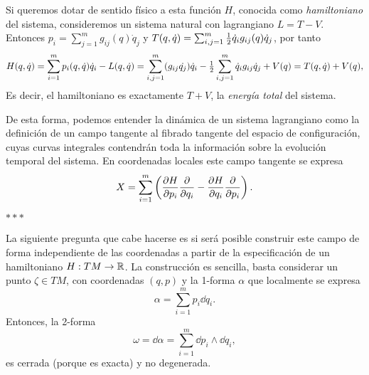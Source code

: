   Si queremos dotar de sentido físico a esta función $H$, conocida como \emph{hamiltoniano} del sistema, consideremos un sistema natural con lagrangiano $L=T-V$. Entonces $p_i=\sum_{j=1}^m g_{ij}(q)\dot{q}_j$ y $T(q,\dot{q})=\sum_{i,j=1}^m\tfrac{1}{2}\dot{q}_ig_{ij}(q)\dot{q}_j$, por tanto
\begin{equation*}
  H(q,\dot{q})=\sum_{i=1}^m p_i(q,\dot{q})\dot{q}_i - L(q,\dot{q})=\sum_{i,j=1}^m (g_{ij} \dot{q_j})\dot{q}_i - \tfrac{1}{2}\sum_{i,j=1}^m \dot{q}_i g_{ij} \dot{q}_j + V(q)=T(q,\dot{q})+V(q),
\end{equation*}
Es decir, el hamiltoniano es exactamente $T+V$, la \emph{energía total} del sistema.
  
 De esta forma, podemos entender la dinámica de un sistema lagrangiano como la definición de un campo tangente al fibrado tangente del espacio de configuración, cuyas curvas integrales contendrán toda la información sobre la evolución temporal del sistema. En coordenadas locales este campo tangente se expresa
 \begin{equation*}
   X=\sum_{i=1}^m \left( \frac{\partial H}{\partial p_i}\frac{\partial}{\partial q_i}-\frac{\partial H}{\partial q_i}\frac{\partial}{\partial p_i} \right).
 \end{equation*}
  
  \begin{center}  $\ast\ast\ast$ \end{center}
 La siguiente pregunta que cabe hacerse es si será posible construir este campo de forma independiente de las coordenadas a partir de la especificación de un hamiltoniano $H:TM \rightarrow \mathbb{R}$. La construcción es sencilla, basta considerar un punto $\zeta \in TM$, con coordenadas $(q,p)$ y la 1-forma $\alpha$ que localmente se expresa
 \begin{equation*}
   \alpha = \sum_{i=1}^m p_i \dd q_i.
 \end{equation*}
 Entonces, la 2-forma
 \begin{equation*}
   \omega=\dd \alpha = \sum_{i=1}^m \dd p_i \wedge \dd q_i,
 \end{equation*}
 es cerrada (porque es exacta) y no degenerada. 

